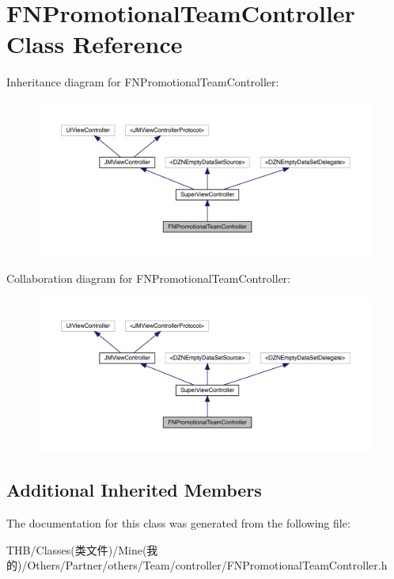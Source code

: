 \hypertarget{interface_f_n_promotional_team_controller}{}\section{F\+N\+Promotional\+Team\+Controller Class Reference}
\label{interface_f_n_promotional_team_controller}


Inheritance diagram for F\+N\+Promotional\+Team\+Controller\+:\nopagebreak
\begin{figure}[H]
\begin{center}
\leavevmode
\includegraphics[width=350pt]{interface_f_n_promotional_team_controller__inherit__graph}
\end{center}
\end{figure}


Collaboration diagram for F\+N\+Promotional\+Team\+Controller\+:\nopagebreak
\begin{figure}[H]
\begin{center}
\leavevmode
\includegraphics[width=350pt]{interface_f_n_promotional_team_controller__coll__graph}
\end{center}
\end{figure}
\subsection*{Additional Inherited Members}


The documentation for this class was generated from the following file\+:\begin{DoxyCompactItemize}
\item 
T\+H\+B/\+Classes(类文件)/\+Mine(我的)/\+Others/\+Partner/others/\+Team/controller/F\+N\+Promotional\+Team\+Controller.\+h\end{DoxyCompactItemize}
